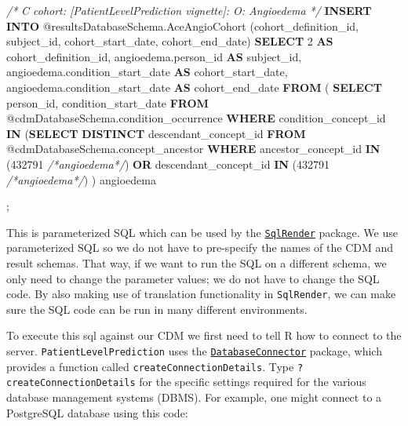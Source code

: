 \documentclass[
]{article}
\newenvironment{Shaded}{\begin{snugshade}}{\end{snugshade}}
\newcommand{\CommentTok}[1]{\textcolor[rgb]{0.56,0.35,0.01}{\textit{#1}}}
\newcommand{\DecValTok}[1]{\textcolor[rgb]{0.00,0.00,0.81}{#1}}
\newcommand{\KeywordTok}[1]{\textcolor[rgb]{0.13,0.29,0.53}{\textbf{#1}}}
\newcommand{\NormalTok}[1]{#1}
\begin{document}
\begin{Shaded}
\begin{Highlighting}[]
  \CommentTok{/*}
\CommentTok{    C cohort:  [PatientLevelPrediction vignette]:  O: Angioedema}
\CommentTok{  */}
    \KeywordTok{INSERT} \KeywordTok{INTO}\NormalTok{ @resultsDatabaseSchema.AceAngioCohort (cohort_definition_id, }
\NormalTok{                                                       subject_id, }
\NormalTok{                                                       cohort_start_date, }
\NormalTok{                                                       cohort_end_date)}
  \KeywordTok{SELECT} \DecValTok{2} \KeywordTok{AS}\NormalTok{ cohort_definition_id,}
\NormalTok{  angioedema.person_id }\KeywordTok{AS}\NormalTok{ subject_id,}
\NormalTok{  angioedema.condition_start_date }\KeywordTok{AS}\NormalTok{ cohort_start_date,}
\NormalTok{  angioedema.condition_start_date }\KeywordTok{AS}\NormalTok{ cohort_end_date}
  \KeywordTok{FROM}  
\NormalTok{  (}
    \KeywordTok{SELECT}\NormalTok{ person_id, condition_start_date}
    \KeywordTok{FROM}\NormalTok{ @cdmDatabaseSchema.condition_occurrence}
    \KeywordTok{WHERE}\NormalTok{ condition_concept_id }\KeywordTok{IN}\NormalTok{ (}\KeywordTok{SELECT} \KeywordTok{DISTINCT}\NormalTok{ descendant_concept_id }\KeywordTok{FROM} 
\NormalTok{                                   @cdmDatabaseSchema.concept_ancestor }\KeywordTok{WHERE}\NormalTok{ ancestor_concept_id }\KeywordTok{IN} 
\NormalTok{                                   (}\DecValTok{432791} \CommentTok{/*angioedema*/}\NormalTok{) }\KeywordTok{OR}\NormalTok{ descendant_concept_id }\KeywordTok{IN} 
\NormalTok{                                   (}\DecValTok{432791} \CommentTok{/*angioedema*/}\NormalTok{)}
\NormalTok{    ) angioedema}
    
\NormalTok{    ;}
    
\end{Highlighting}
\end{Shaded}

This is parameterized SQL which can be used by the
\href{http://github.com/OHDSI/SqlRender}{\texttt{SqlRender}} package. We
use parameterized SQL so we do not have to pre-specify the names of the
CDM and result schemas. That way, if we want to run the SQL on a
different schema, we only need to change the parameter values; we do not
have to change the SQL code. By also making use of translation
functionality in \texttt{SqlRender}, we can make sure the SQL code can
be run in many different environments.

To execute this sql against our CDM we first need to tell R how to
connect to the server. \texttt{PatientLevelPrediction} uses the
\href{http://github.com/ohdsi/DatabaseConnector}{\texttt{DatabaseConnector}}
package, which provides a function called
\texttt{createConnectionDetails}. Type \texttt{?createConnectionDetails}
for the specific settings required for the various database management
systems (DBMS). For example, one might connect to a PostgreSQL database
using this code:
\end{document}
